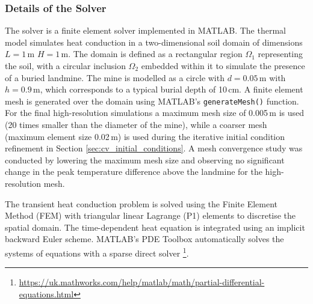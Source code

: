     
    \subsubsection{Details of the Solver}
    
        The solver is a finite element solver implemented in MATLAB. The thermal model simulates heat conduction in a two-dimensional soil domain of dimensions $L =1$\,m $H = 1$\,m. The domain is defined as a rectangular region $\Omega_1$ representing the soil, with a circular inclusion $\Omega_2$ embedded within it to simulate the presence of a buried landmine. The mine is modelled as a circle with \(d=0.05\,\text{m}\) with \(h=0.9\,\text{m}\), which corresponds to a typical burial depth of 10\,cm. A finite element mesh is generated over the domain using MATLAB's \texttt{generateMesh()} function. For the final high-resolution simulations a maximum mesh size of 0.005\,m is used (20 times smaller than the diameter of the mine), while a coarser mesh (maximum element size 0.02\,m) is used during the iterative initial condition refinement in Section \ref{sec:cv_initial_conditions}. A mesh convergence study was conducted by lowering the maximum mesh size and observing no significant change in the peak temperature difference above the landmine for the high-resolution mesh.
        
        The transient heat conduction problem is solved using the Finite Element Method (FEM) with triangular linear Lagrange (P1) elements to discretise the spatial domain. The time-dependent heat equation is integrated using an implicit backward Euler scheme. MATLAB's PDE Toolbox automatically solves the systems of equations with a sparse direct solver \footnote{\url{https://uk.mathworks.com/help/matlab/math/partial-differential-equations.html}}.
    
